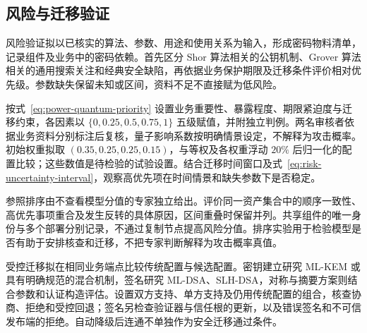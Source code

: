 
\subsection{风险与迁移验证}
\label{sec:risk-migration-plan}

风险验证拟以已核实的算法、参数、用途和使用关系为输入，形成密码物料清单，记录组件及业务中的密码依赖\cite{cbom16}。首先区分 Shor 算法相关的公钥机制、Grover 算法相关的通用搜索关注和经典安全缺陷，再依据业务保护期限及迁移条件评价相对优先级。参数缺失保留未知或区间，资料不足不直接赋为低风险。

按式~\eqref{eq:power-quantum-priority} 设置业务重要性、暴露程度、期限紧迫度与迁移约束，各因素以 $\{0,0.25,0.5,0.75,1\}$ 五级赋值，并附独立判例。两名审核者依据业务资料分别标注后复核，量子影响系数按明确情景设定，不解释为攻击概率。初始权重拟取 $(0.35,0.25,0.25,0.15)$，与等权及各权重浮动 $20\%$ 后归一化的配置比较；这些数值是待检验的试验设置。结合迁移时间窗口及式~\eqref{eq:risk-uncertainty-interval}，观察高优先项在时间情景和缺失参数下是否稳定。

参照排序由不查看模型分值的专家独立给出。评价同一资产集合中的顺序一致性、高优先事项重合及发生反转的具体原因，区间重叠时保留并列。共享组件的唯一身份与多个部署分别记录，不通过复制节点提高风险分值。排序实验用于检验模型是否有助于安排核查和迁移，不把专家判断解释为攻击概率真值。

受控迁移拟在相同业务端点比较传统配置与候选配置。密钥建立研究 ML-KEM 或具有明确规范的混合机制，签名研究 ML-DSA、SLH-DSA\cite{nistfips203,nistfips204,nistfips205}，对称与摘要方案则结合参数和认证构造评估。设置双方支持、单方支持及仍用传统配置的组合，核查协商、拒绝和受控回退；签名另检查验证器与信任根的更新，以及错误签名和不可信发布端的拒绝。自动降级后连通不单独作为安全迁移通过条件。

